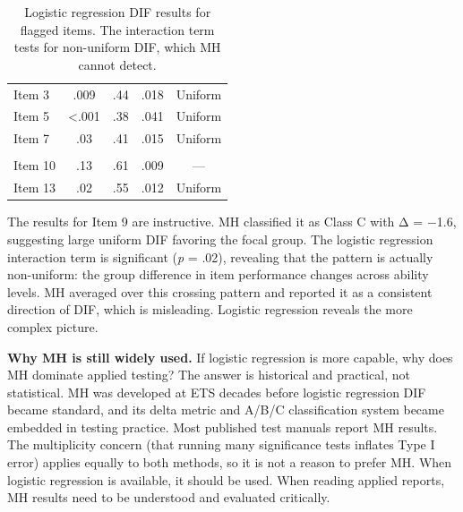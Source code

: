 \documentclass[
  11pt,
  letterpaper,
]{scrbook}
\begin{document}
\begin{longtable}[t]{lcccc}

\caption{\label{tbl-lr-results}Logistic regression DIF results for
flagged items. The interaction term tests for non-uniform DIF, which MH
cannot detect.}

\tabularnewline

\toprule
\cellcolor[HTML]{2E4057}{\textcolor{white}{Item}} & \cellcolor[HTML]{2E4057}{\textcolor{white}{Group term p}} & \cellcolor[HTML]{2E4057}{\textcolor{white}{Interaction p}} & \cellcolor[HTML]{2E4057}{\textcolor{white}{R² change}} & \cellcolor[HTML]{2E4057}{\textcolor{white}{DIF type}}\\
\midrule
Item 3 & .009 & .44 & .018 & Uniform\\
Item 5 & <.001 & .38 & .041 & Uniform\\
Item 7 & .03 & .41 & .015 & Uniform\\
\cellcolor[HTML]{FFF2CC}{Item 9} & \cellcolor[HTML]{FFF2CC}{.004} & \cellcolor[HTML]{FFF2CC}{.02} & \cellcolor[HTML]{FFF2CC}{.031} & \cellcolor[HTML]{FFF2CC}{Non-uniform}\\
Item 10 & .13 & .61 & .009 & —\\
\addlinespace
Item 13 & .02 & .55 & .012 & Uniform\\
\bottomrule

\end{longtable}

The results for Item 9 are instructive. MH classified it as Class C with
Δ = −1.6, suggesting large uniform DIF favoring the focal group. The
logistic regression interaction term is significant (\emph{p} = .02),
revealing that the pattern is actually non-uniform: the group difference
in item performance changes across ability levels. MH averaged over this
crossing pattern and reported it as a consistent direction of DIF, which
is misleading. Logistic regression reveals the more complex picture.

\textbf{Why MH is still widely used.} If logistic regression is more
capable, why does MH dominate applied testing? The answer is historical
and practical, not statistical. MH was developed at ETS decades before
logistic regression DIF became standard, and its delta metric and A/B/C
classification system became embedded in testing practice. Most
published test manuals report MH results. The multiplicity concern (that
running many significance tests inflates Type I error) applies equally
to both methods, so it is not a reason to prefer MH. When logistic
regression is available, it should be used. When reading applied
reports, MH results need to be understood and evaluated critically.
\end{document}
